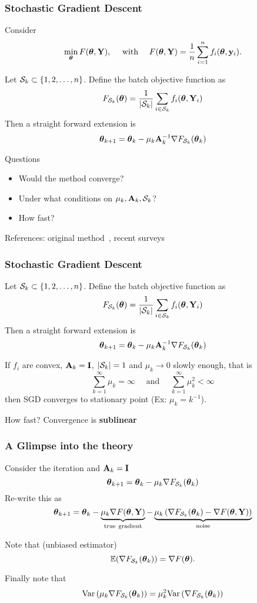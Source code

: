 \documentclass[12pt,fleqn,handout]{beamer}
\begin{document}
\begin{frame}[fragile]\frametitle{Stochastic Gradient Descent}
Consider 
$$
\min_{{\boldsymbol \theta}} F({\boldsymbol \theta},{\bf Y}), \quad \text{ with }\quad  F({\boldsymbol \theta},{\bf Y}) = \frac1n\sum_{i=1}^n f_i({\boldsymbol \theta},{\bf y}_i).
$$

Let ${\cal S}_k \subset \{1,2,\ldots,n\}$. Define the batch objective function as 
$$ F_{{\cal S}_k}({\boldsymbol \theta}) = \frac{1}{|{\cal S}_k|} \sum_{i \in {\cal S}_k} f_i({\boldsymbol \theta},{\bf Y}_i) $$
Then a straight forward extension  is
$$ {\boldsymbol \theta}_{k+1} = {\boldsymbol \theta}_k - \mu_k {\bf A}_k^{-1}  \nabla F_{{\cal S}_k}({\boldsymbol \theta}_k) $$


Questions
\begin{itemize}
\item Would the method converge?
\item Under what conditions on $\mu_k,{\bf A}_k,{\cal S}_k$?
\item How fast?
\end{itemize}

References: original method~\cite{RobbinsMonro1951}, recent surveys~\cite{Bottou2012,Bertsekas2015,bottou2016optimization}
\end{frame}

\begin{frame}[fragile]\frametitle{Stochastic Gradient Descent}

Let ${\cal S}_k \subset \{1,2,\ldots,n\}$. Define the batch objective function as 
$$ F_{{\cal S}_k}({\boldsymbol \theta}) = \frac{1}{|{\cal S}_k|} \sum_{i \in {\cal S}_k} f_i({\boldsymbol \theta},{\bf Y}_i) $$
Then a straight forward extension   is
$$ {\boldsymbol \theta}_{k+1} = {\boldsymbol \theta}_k - \mu_k {\bf A}_k^{-1}  \nabla F_{{\cal S}_k}({\boldsymbol \theta}_k) $$

\bigskip
\pause

If $f_i$ are convex, ${\bf A}_k = {\bf I}$, $|{\cal S}_k|=1$ and $\mu_k \rightarrow 0$ slowly enough, that is
$$ \sum_{k=1}^{\infty} \mu_k= \infty \quad \text{ and } \quad \sum_{k=1}^{\infty} \mu_k^2 < \infty$$
then SGD converges to stationary point \pause (Ex: $\mu_k = k^{-1}$).

\bigskip
\pause

How fast? Convergence is {\bf sublinear}

\end{frame}


\begin{frame}\frametitle{A Glimpse into the theory}
	Consider the iteration and ${\bf A}_k={\bf I}$
	$$ 
	{\boldsymbol \theta}_{k+1} = {\boldsymbol \theta}_k - \mu_k  \nabla F_{{\cal S}_k}({\boldsymbol \theta}_k) 
	$$
	\pause
	Re-write this as
	$$ 
	{\boldsymbol \theta}_{k+1} = {\boldsymbol \theta}_k - \underbrace{\mu_k \nabla F({\boldsymbol \theta},{\bf Y})}_{\rm true\ gradient} -  \underbrace{\mu_k \left ( \nabla F_{{\cal S}_k}({\boldsymbol \theta}_k)  - \nabla F ({\boldsymbol \theta},{\bf Y})\right)}_{\rm noise}
	$$
	
	\pause
	
	Note that (unbiased estimator)
	$$
	 {\mathbb{E}} (\nabla F_{{\cal S}_k}({\boldsymbol \theta}_k)) = \nabla F ({\boldsymbol \theta}).
	$$
	
	\pause
	
	Finally note that
	$$
		{\rm Var}\left( \mu_k \nabla F_{{\cal S}_k}({\boldsymbol \theta}_k) \right) = \mu_k^2 {\rm Var}\left( \nabla F_{{\cal S}_k}({\boldsymbol \theta}_k) \right)
	$$
\end{frame}
\end{document}
